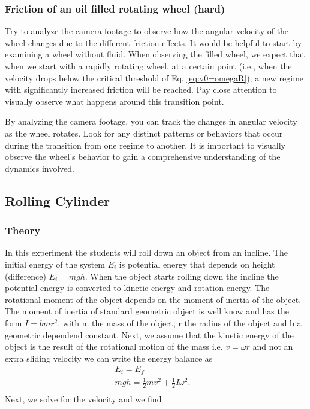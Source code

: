 \documentclass{article}
\begin{document}
\subsubsection{Friction of an oil filled rotating wheel (hard)}
Try to analyze the camera footage to observe how the angular velocity of the wheel changes due to the different friction effects. It would be helpful to start by examining a wheel without fluid. When observing the filled wheel, we expect that when we start with a rapidly rotating wheel, at a certain point (i.e., when the velocity drops below the critical threshold of Eq. \ref{eq:v0=omegaR}), a new regime with significantly increased friction will be reached. Pay close attention to visually observe what happens around this transition point.

By analyzing the camera footage, you can track the changes in angular velocity as the wheel rotates. Look for any distinct patterns or behaviors that occur during the transition from one regime to another. It is important to visually observe the wheel's behavior to gain a comprehensive understanding of the dynamics involved.



\newpage

\subsection{Rolling Cylinder}
\subsubsection{Theory}
In this experiment the students will roll down an object from an incline. The initial energy of the system $E_i$ is potential energy that depends on height (difference) $E_i = mgh$. When the object starts rolling down the incline the potential energy is converted to kinetic energy and rotation energy. The rotational moment of the object depends on the moment of inertia of the object. The moment of inertia of standard geometric object is well know and has the form $I = bmr^2$, with m the mass of the object, r the radius of the object and b a geometric dependend constant. Next, we assume that the kinetic energy of the object is the result of the rotational motion of the mass i.e. $v = \omega r$ and not an extra sliding velocity we can write the energy balance as
\begin{align}
    E_i = E_f & \\
    mgh = \frac{1}{2}mv^2 + \frac{1}{2}I\omega^2. & \\
\end{align}
Next, we solve for the velocity and we find 
\end{document}
